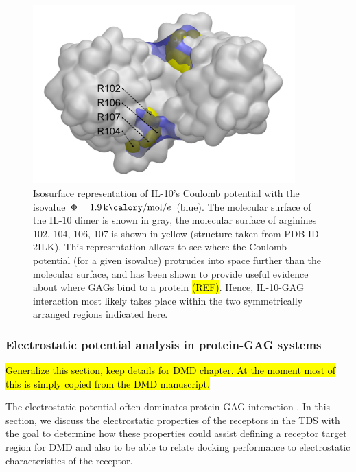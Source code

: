 \begin{figure}
\centering
\includegraphics[width=0.9\textwidth]{gfx/bspred/SI_figure_IL-10_coulomb_isosurface_1_9kcalmol.png}
\caption[]{
Isosurface representation of IL-10's Coulomb potential with the isovalue $\Phi =
\SI{1.9}{\kilo\calory\per\mole\per\elementarycharge}$ (blue). The molecular
surface of the IL-10 dimer is shown in gray, the molecular surface of arginines
102, 104, 106, 107 is shown in yellow (structure taken from PDB ID 2ILK). This
representation allows to see where the Coulomb potential (for a given isovalue)
protrudes into space further than the molecular surface, and has been shown to
provide useful evidence about where GAGs bind to a protein \hl{(REF)}. Hence,
IL-10-GAG interaction most likely takes place within the two symmetrically
arranged regions indicated here.
}
\label{fig:bspred:il10_estatic_pred}
\end{figure}


\subsubsection{Electrostatic potential analysis in protein-GAG systems}

\hl{Generalize this section, keep details for DMD chapter. At the moment most of
this is simply copied from the DMD manuscript.}

The electrostatic potential often dominates protein-GAG interaction
\cite{gandhi_structure_2008}. In this section, we discuss the electrostatic
properties of the receptors in the TDS with the goal to determine how these
properties could assist defining a receptor target region for DMD and also to be
able to relate docking performance to electrostatic characteristics of the
receptor.



